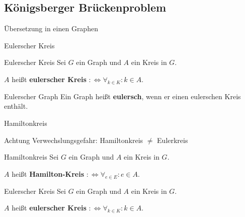 \subsection{Königsberger Brückenproblem}




\begin{frame}{Übersetzung in einen Graphen}
\begin{center}
\end{center}
\end{frame}

\begin{frame}{Eulerscher Kreis}
\begin{block}{Eulerscher Kreis}
Sei $G$ ein Graph und $A$ ein Kreis in $G$.

$A$ heißt \textbf{eulerscher Kreis} $:\Leftrightarrow \forall_{k \in K}: k \in A$.
\end{block}

\begin{block}{Eulerscher Graph}
Ein Graph heißt \textbf{eulersch}, wenn er einen eulerschen Kreis enthält.
\end{block}
\end{frame}

\begin{frame}{Hamiltonkreis}
\begin{alertblock}{Achtung}
Verwechslungsgefahr: Hamiltonkreis $\neq$ Eulerkreis
\end{alertblock}
\pause
\begin{block}{Hamiltonkreis}
Sei $G$ ein Graph und $A$ ein Kreis in $G$.

$A$ heißt \textbf{Hamilton-Kreis} $:\Leftrightarrow \forall_{e \in E}: e \in A$.
\end{block}

\begin{block}{Eulerscher Kreis}
Sei $G$ ein Graph und $A$ ein Kreis in $G$.

$A$ heißt \textbf{eulerscher Kreis} $:\Leftrightarrow \forall_{k \in K}: k \in A$.
\end{block}
\end{frame}

